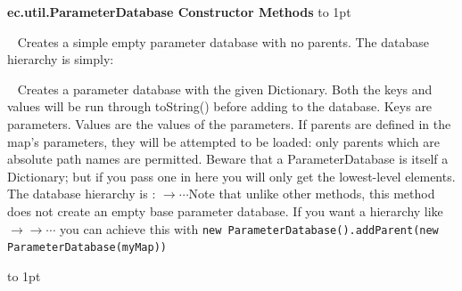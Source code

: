 \documentclass[twoside,10pt]{book}
\newcommand\method[1]{\index{#1}\textsf{#1}}
\newcommand*{\xfill}[1][0pt]{%
	\cleaders
		\hbox to 1pt{\hss
			\raisebox{#1}{\rule{1.2pt}{0.4pt}}%
			\hss}\hfill}
\newenvironment{methods}[1]{
\vspace{1.0em}\noindent\textsf{\textbf{#1 Methods}}\quad \xfill[0.5ex]
\vspace{-0.25em}
\begin{description}
\small}
{\end{description}\vspace{-0.5em}\rule{0pt}{0pt}\xfill[0ex]\vspace{1em}}
\newcommand{\mthd}[1]{\item[{\sf #1}]~\newline}
\begin{document}
\begin{methods}{ec.util.ParameterDatabase Constructor}
\mthd{public ParameterDatabase()}
Creates a simple empty parameter database with no parents.  The database hierarchy is simply: 
\mthd{public ParameterDatabase(Dictionary map)}
Creates a parameter database with the given Dictionary. Both the keys and values will be run through \method{toString()} before adding to the database. Keys are parameters. Values are the values of the parameters. If parents are defined in the map's parameters, they will be attempted to be loaded: only parents which are absolute path names are permitted.  Beware that a ParameterDatabase is itself a Dictionary; but if you pass one in here you will only get the lowest-level elements.    The database hierarchy is : \(\rightarrow\cdots\)\quad Note that unlike other methods, this method does not create an empty base parameter database.  If you want a hierarchy like \(\rightarrow\)\(\rightarrow\cdots\) you can achieve this with {\tt new ParameterDatabase().addParent(new ParameterDatabase(myMap))}


\end{methods}
\end{document}
